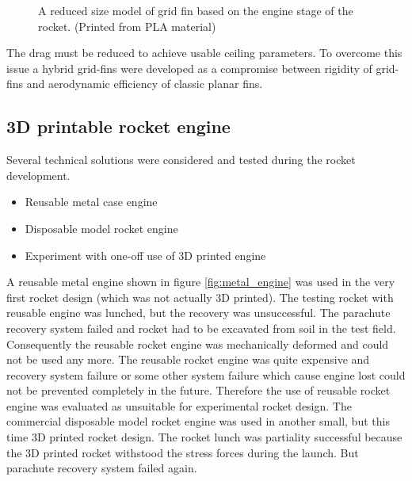 \documentclass{poster16}
\begin{document}
\begin{figure}[ht]
\begin{center}
\caption{A reduced size model of grid fin based on the engine stage of the rocket. (Printed from PLA material) } 
\label{fig:grid_fin}
\end{center}
\end{figure}


The drag must be reduced to achieve usable ceiling parameters. To overcome this issue a hybrid grid-fins were developed as a compromise between rigidity of grid-fins and aerodynamic efficiency of classic planar fins. 


\subsection{3D printable rocket engine}

Several technical solutions were considered and tested during the rocket development. 

\begin{itemize}
\item Reusable metal case engine
\item Disposable model rocket engine
\item Experiment with one-off use of 3D printed engine
\end{itemize}

A reusable metal engine shown in figure \ref{fig:metal_engine} was used in the very first rocket design (which was not actually 3D printed). The testing rocket with reusable engine was lunched, but the recovery was unsuccessful. The parachute recovery system failed and rocket had to be excavated from soil in the test field. Consequently the reusable rocket engine was mechanically deformed and could not be used any more.
The reusable rocket engine was quite expensive and recovery system failure or some other system failure which cause engine lost could not be prevented completely in the future. Therefore the use of reusable rocket engine was evaluated as unsuitable for experimental rocket design. 
The commercial disposable model rocket engine was used in another small, but this time 3D printed rocket design. The rocket lunch was partiality successful because the 3D printed rocket withstood the stress forces during the launch.  But parachute recovery system failed again. 
\end{document}
